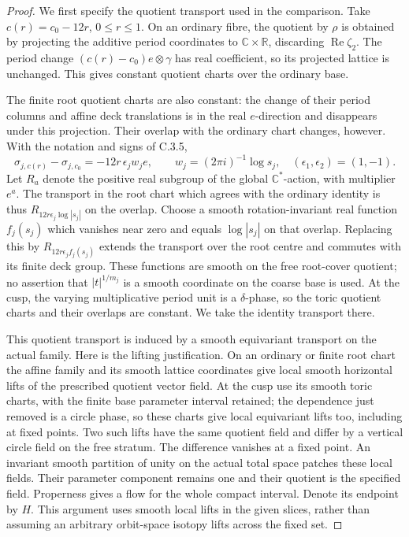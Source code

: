 \begin{proof}
We first specify the quotient transport used in the comparison.
Take $c(r)=c_0-12r$, $0\leq r\leq1$. On an ordinary fibre,
the quotient by $\rho$ is obtained by projecting the additive
period coordinates to $\mathbb C\times\mathbb R$, discarding
$\operatorname{Re}\zeta_2$. The period change
$(c(r)-c_0)e\otimes\gamma$ has real coefficient, so its
projected lattice is unchanged. This gives constant quotient
charts over the ordinary base.

The finite root quotient charts are also constant: the change of
their period columns and affine deck translations is in the real
$e$-direction and disappears under this projection. Their overlap
with the ordinary chart changes, however. With the notation and
signs of C.3.5,
\[
 \sigma_{j,c(r)}-\sigma_{j,c_0}
       =-12r\,\epsilon_j w_j e,
 \qquad w_j=(2\pi i)^{-1}\log s_j,
 \quad (\epsilon_1,\epsilon_2)=(1,-1).
\]
Let $R_a$ denote the positive real subgroup of the global
$\mathbb C^*$-action, with multiplier $e^a$. The transport in
the root chart which agrees with the ordinary identity is thus
$R_{12r\epsilon_j\log|s_j|}$ on the overlap. Choose a smooth
rotation-invariant real function $f_j(s_j)$ which vanishes near
zero and equals $\log|s_j|$ on that overlap. Replacing this by
$R_{12r\epsilon_j f_j(s_j)}$ extends the transport over the
root centre and commutes with its finite deck group. These
functions are smooth on the free root-cover quotient; no assertion
that $|t|^{1/m_j}$ is a smooth coordinate on the coarse base is
used. At the cusp, the varying multiplicative period unit is a
$\delta$-phase, so the toric quotient charts and their overlaps
are constant. We take the identity transport there.

This quotient transport is induced by a smooth equivariant
transport on the actual family. Here is the lifting justification.
On an ordinary or finite root chart the affine family and its
smooth lattice coordinates give local smooth horizontal lifts of
the prescribed quotient vector field. At the cusp use its smooth
toric charts, with the finite base parameter interval retained;
the dependence just removed is a circle phase, so these charts
give local equivariant lifts too, including at fixed points.
Two such lifts have the same quotient field and differ by a
vertical circle field on the free stratum. The difference vanishes
at a fixed point. An invariant smooth partition of unity on the
actual total space patches these local fields. Their parameter
component remains one and their quotient is the specified field.
Properness gives a flow for the whole compact interval. Denote
its endpoint by $H$. This argument uses smooth local lifts in the
given slices, rather than assuming an arbitrary orbit-space
isotopy lifts across the fixed set.


\end{proof}
